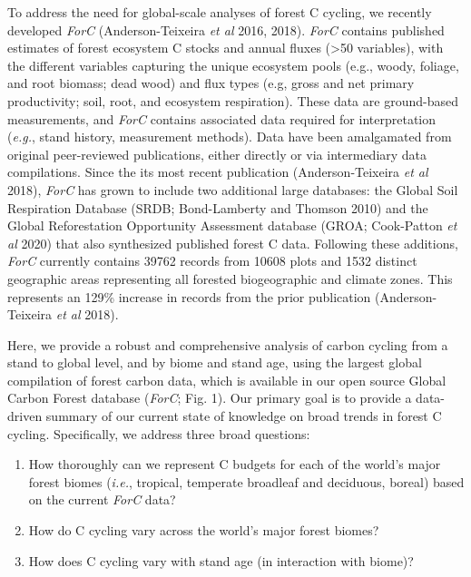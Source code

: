 \documentclass[
]{article}
\begin{document}
To address the need for global-scale analyses of forest C cycling, we
recently developed \emph{ForC} (Anderson-Teixeira \emph{et al} 2016,
2018). \emph{ForC} contains published estimates of forest ecosystem C
stocks and annual fluxes (\textgreater50 variables), with the different
variables capturing the unique ecosystem pools (e.g., woody, foliage,
and root biomass; dead wood) and flux types (e.g, gross and net primary
productivity; soil, root, and ecosystem respiration). These data are
ground-based measurements, and \emph{ForC} contains associated data
required for interpretation (\emph{e.g.}, stand history, measurement
methods). Data have been amalgamated from original peer-reviewed
publications, either directly or via intermediary data compilations.
Since the its most recent publication (Anderson-Teixeira \emph{et al}
2018), \emph{ForC} has grown to include two additional large databases:
the Global Soil Respiration Database (SRDB; Bond-Lamberty and Thomson
2010) and the Global Reforestation Opportunity Assessment database
(GROA; Cook-Patton \emph{et al} 2020) that also synthesized published
forest C data. Following these additions, \emph{ForC} currently contains
39762 records from 10608 plots and 1532 distinct geographic areas
representing all forested biogeographic and climate zones. This
represents an 129\% increase in records from the prior publication
(Anderson-Teixeira \emph{et al} 2018).

Here, we provide a robust and comprehensive analysis of carbon cycling
from a stand to global level, and by biome and stand age, using the
largest global compilation of forest carbon data, which is available in
our open source Global Carbon Forest database (\emph{ForC}; Fig. 1). Our
primary goal is to provide a data-driven summary of our current state of
knowledge on broad trends in forest C cycling. Specifically, we address
three broad questions:

\begin{enumerate}
\def\labelenumi{\arabic{enumi}.}
\item
  How thoroughly can we represent C budgets for each of the world's
  major forest biomes (\emph{i.e.}, tropical, temperate broadleaf and
  deciduous, boreal) based on the current \emph{ForC} data?
\item
  How do C cycling vary across the world's major forest biomes?
\item
  How does C cycling vary with stand age (in interaction with biome)?
\end{enumerate}
\end{document}
